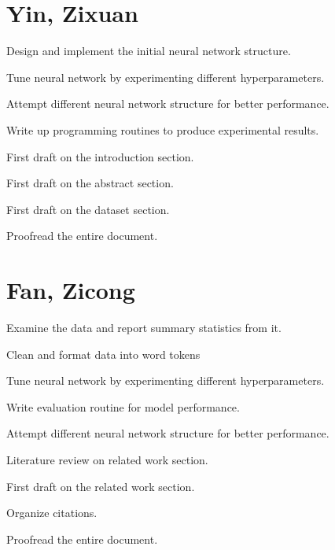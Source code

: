 \begin{appendices}

\section{Yin, Zixuan} 

\begin{compactitem}
\item Design and implement the initial neural network structure.
\item Tune neural network by experimenting different hyperparameters.
\item Attempt different neural network structure for better performance.
\item Write up programming routines to produce experimental results.
\item First draft on the introduction section.
\item First draft on the abstract section.
\item First draft on the dataset section.
\item Proofread the entire document.
\end{compactitem}


\section{Fan, Zicong }
\begin{compactitem}
\item Examine the data and report summary statistics from it. 
\item Clean and format data into word tokens 
\item Tune neural network by experimenting different hyperparameters.
\item Write evaluation routine for model performance.
\item Attempt different neural network structure for better performance.
\item Literature review on related work section.
\item First draft on the related work section.
\item Organize citations.
\item Proofread the entire document.
\end{compactitem}


\end{appendices}
